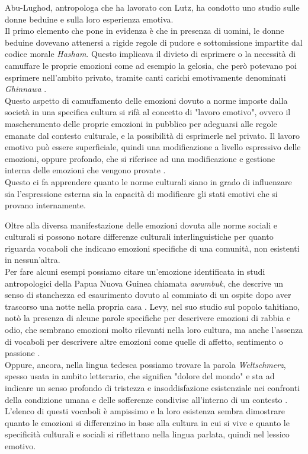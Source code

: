 Abu-Lughod, antropologa che ha lavorato con Lutz, ha condotto uno studio sulle donne beduine e sulla loro esperienza emotiva. \\
Il primo elemento che pone in evidenza è che in presenza di uomini, le donne beduine dovevano attenersi a rigide regole di pudore e sottomissione impartite dal codice morale \textit{Hasham}. Questo implicava il divieto di esprimere o la necessità di camuffare le proprie emozioni come ad esempio la gelosia, che però potevano poi esprimere nell'ambito privato, tramite canti carichi emotivamente denominati \textit{Ghinnawa} \parencite{abu_lughod}. \\
Questo aspetto di camuffamento delle emozioni dovuto a norme imposte dalla società in una specifica cultura si rifà al concetto di "lavoro emotivo", ovvero il mascheramento delle proprie emozioni in pubblico per adeguarsi alle regole emanate dal contesto culturale, e la possibilità di esprimerle nel privato. Il lavoro emotivo può essere superficiale, quindi una modificazione a livello espressivo delle emozioni, oppure profondo, che si riferisce ad una modificazione e gestione interna delle emozioni che vengono provate \parencite{hochschild}.\\
Questo ci fa apprendere quanto le norme culturali siano in grado di influenzare sia l'espressione esterna sia la capacità di modificare gli stati emotivi che si provano internamente.

Oltre alla diversa manifestazione delle emozioni dovuta alle norme sociali e culturali si possono notare differenze culturali interlinguistiche per quanto riguarda vocaboli che indicano emozioni specifiche di una comunità, non esistenti in nessun'altra. \\
Per fare alcuni esempi possiamo citare un'emozione identificata in studi antropologici della Papua Nuova Guinea chiamata \textit{awumbuk}, che descrive un senso di stanchezza ed esaurimento dovuto al commiato di un ospite dopo aver trascorso una notte nella propria casa \parencite{fajans}. \clearpage
Levy, nel suo studio sul popolo tahitiano, notò la presenza di alcune parole specifiche per descrivere emozioni di rabbia e odio, che sembrano emozioni molto rilevanti nella loro cultura, ma anche l'assenza di vocaboli per descrivere altre emozioni come quelle di affetto, sentimento o passione \parencite{levy_thaitians}. \\
Oppure, ancora, nella lingua tedesca possiamo trovare la parola \textit{Weltschmerz}, spesso usata in ambito letterario, che significa "dolore del mondo" e sta ad indicare un senso profondo di tristezza e insoddisfazione esistenziale nei confronti della condizione umana e delle sofferenze condivise all'interno di un contesto \parencite{goethe}. \\
L'elenco di questi vocaboli è ampissimo e la loro esistenza sembra dimostrare quanto le emozioni si differenzino in base alla cultura in cui si vive e quanto le specificità culturali e sociali si riflettano nella lingua parlata, quindi nel lessico emotivo. 

